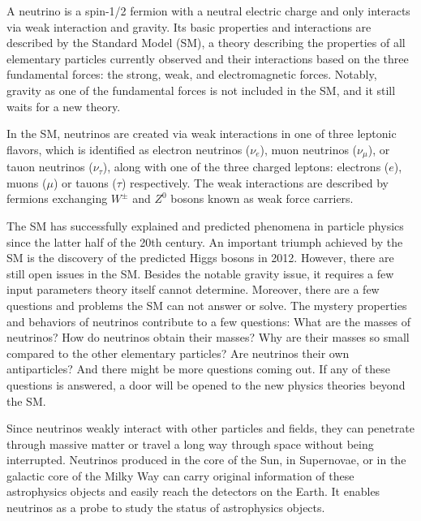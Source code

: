 
A neutrino is a spin-1/2 fermion with a neutral electric charge and only interacts via weak interaction and gravity. Its basic properties and interactions are described by the Standard Model (SM), a theory describing the properties of all elementary particles currently observed and their interactions based on the three fundamental forces: the strong, weak, and electromagnetic forces. Notably, gravity as one of the fundamental forces is not included in the SM, and it still waits for a new theory. 

In the SM, neutrinos are created via weak interactions in one of three leptonic flavors, which is identified as electron neutrinos ($\nu_e$), muon neutrinos ($\nu_\mu$), or tauon neutrinos ($\nu_\tau$), along with one of the three charged leptons: electrons ($e$), muons ($\mu$) or tauons ($\tau$) respectively. The weak interactions are described by fermions exchanging $W^{\pm}$ and $Z^0$ bosons known as weak force carriers.

The SM has successfully explained and predicted phenomena in particle physics since the latter half of the 20th century. An important triumph achieved by the SM is the discovery of the predicted Higgs bosons in 2012. However, there are still open issues in the SM. Besides the notable gravity issue, it requires a few input parameters theory itself cannot determine. Moreover, there are a few questions and problems the SM can not answer or solve. The mystery properties and behaviors of neutrinos contribute to a few questions: What are the masses of neutrinos? How do neutrinos obtain their masses? Why are their masses so small compared to the other elementary particles? Are neutrinos their own antiparticles? And there might be more questions coming out. If any of these questions is answered, a door will be opened to the new physics theories beyond the SM.

Since neutrinos weakly interact with other particles and fields, they can penetrate through massive matter or travel a long way through space without being interrupted. Neutrinos produced in the core of the Sun, in Supernovae, or in the galactic core of the Milky Way can carry original information of these astrophysics objects and easily reach the detectors on the Earth. It enables neutrinos as a probe to study the status of astrophysics objects.

